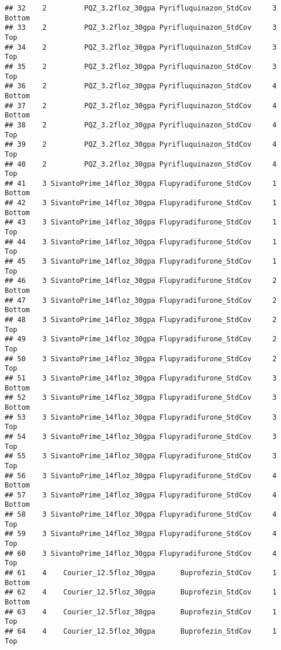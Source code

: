 \documentclass[
]{article}
\begin{document}
\begin{verbatim}
## 32    2         PQZ_3.2floz_30gpa Pyrifluquinazon_StdCov     3        Bottom
## 33    2         PQZ_3.2floz_30gpa Pyrifluquinazon_StdCov     3           Top
## 34    2         PQZ_3.2floz_30gpa Pyrifluquinazon_StdCov     3           Top
## 35    2         PQZ_3.2floz_30gpa Pyrifluquinazon_StdCov     3           Top
## 36    2         PQZ_3.2floz_30gpa Pyrifluquinazon_StdCov     4        Bottom
## 37    2         PQZ_3.2floz_30gpa Pyrifluquinazon_StdCov     4        Bottom
## 38    2         PQZ_3.2floz_30gpa Pyrifluquinazon_StdCov     4           Top
## 39    2         PQZ_3.2floz_30gpa Pyrifluquinazon_StdCov     4           Top
## 40    2         PQZ_3.2floz_30gpa Pyrifluquinazon_StdCov     4           Top
## 41    3 SivantoPrime_14floz_30gpa Flupyradifurone_StdCov     1        Bottom
## 42    3 SivantoPrime_14floz_30gpa Flupyradifurone_StdCov     1        Bottom
## 43    3 SivantoPrime_14floz_30gpa Flupyradifurone_StdCov     1           Top
## 44    3 SivantoPrime_14floz_30gpa Flupyradifurone_StdCov     1           Top
## 45    3 SivantoPrime_14floz_30gpa Flupyradifurone_StdCov     1           Top
## 46    3 SivantoPrime_14floz_30gpa Flupyradifurone_StdCov     2        Bottom
## 47    3 SivantoPrime_14floz_30gpa Flupyradifurone_StdCov     2        Bottom
## 48    3 SivantoPrime_14floz_30gpa Flupyradifurone_StdCov     2           Top
## 49    3 SivantoPrime_14floz_30gpa Flupyradifurone_StdCov     2           Top
## 50    3 SivantoPrime_14floz_30gpa Flupyradifurone_StdCov     2           Top
## 51    3 SivantoPrime_14floz_30gpa Flupyradifurone_StdCov     3        Bottom
## 52    3 SivantoPrime_14floz_30gpa Flupyradifurone_StdCov     3        Bottom
## 53    3 SivantoPrime_14floz_30gpa Flupyradifurone_StdCov     3           Top
## 54    3 SivantoPrime_14floz_30gpa Flupyradifurone_StdCov     3           Top
## 55    3 SivantoPrime_14floz_30gpa Flupyradifurone_StdCov     3           Top
## 56    3 SivantoPrime_14floz_30gpa Flupyradifurone_StdCov     4        Bottom
## 57    3 SivantoPrime_14floz_30gpa Flupyradifurone_StdCov     4        Bottom
## 58    3 SivantoPrime_14floz_30gpa Flupyradifurone_StdCov     4           Top
## 59    3 SivantoPrime_14floz_30gpa Flupyradifurone_StdCov     4           Top
## 60    3 SivantoPrime_14floz_30gpa Flupyradifurone_StdCov     4           Top
## 61    4    Courier_12.5floz_30gpa      Buprofezin_StdCov     1        Bottom
## 62    4    Courier_12.5floz_30gpa      Buprofezin_StdCov     1        Bottom
## 63    4    Courier_12.5floz_30gpa      Buprofezin_StdCov     1           Top
## 64    4    Courier_12.5floz_30gpa      Buprofezin_StdCov     1           Top

\end{verbatim}
\end{document}
